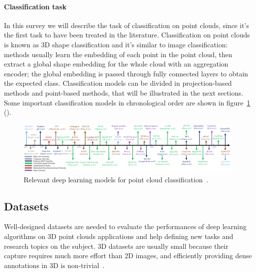 

\paragraph{Classification task}

In this survey we will describe the task of classification on point clouds, since it's the first task to have been treated in the literature. Classification on point clouds is known as 3D shape classification and it's similar to image classification: methods usually learn the embedding of each point in the point cloud, then extract a global shape embedding for the whole cloud with an aggregation encoder; the global embedding is passed through fully connected layers to obtain the expected class. Classification models can be divided in projection-based methods and point-based methods, that will be illustrated in the next sections. Some important classification models in chronological order are shown in figure~\ref{fig:chrono_deep} (\cite{guo2020deep}).

\begin{figure}[ht]
    \centering
    \includegraphics[width=\textwidth]{images/chrono_deep.png}
    \caption{Relevant deep learning models for point cloud classification~\cite{guo2020deep}.}
    \label{fig:chrono_deep}
\end{figure}

\subsection{Datasets}
\label{subsec:datasets}

Well-designed datasets are needed to evaluate the performances of deep learning algorithms on 3D point clouds applications and help defining new tasks and research topics on the subject. 3D datasets are usually small because their capture requires much more effort than 2D images, and efficiently providing dense annotations in 3D is non-trivial~\cite{dai2017scannet}.

